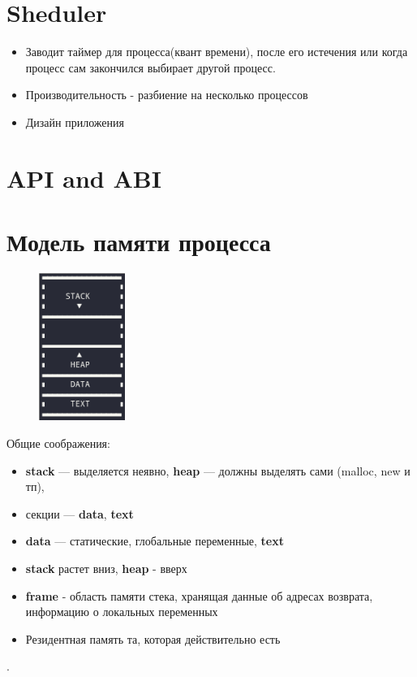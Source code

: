 \documentclass[../lectures.tex]{subfiles}
\begin{document}
\section{Sheduler}
\begin{itemize}
    \item Заводит таймер для процесса(квант времени), после его истечения 
    или когда процесс сам закончился выбирает другой процесс.

    \item Производительность - разбиение на несколько процессов

    \item Дизайн приложения
\end{itemize}
\section{API and ABI}

\newpage
\section{Модель памяти процесса}
\begin{figure}
    \includegraphics[width=0.25\textwidth]{images/memory.png}
\end{figure}
\hspace{15pt} Общие соображения:
\begin{itemize}
    \item \textbf{stack} --- выделяется неявно, \textbf{heap} --- должны выделять сами (malloc, new и тп),
    \item секции --- \textbf{data}, \textbf{text}
    \item \textbf{data} --- статические, глобальные переменные, \textbf{text}
    \item \textbf{stack} растет вниз, \textbf{heap} - вверх
    \item \textbf{frame} - область памяти стека, хранящая данные об адресах возврата, информацию о локальных переменных
    \item Резидентная память та, которая действительно есть
\end{itemize}
.\\
\end{document}
